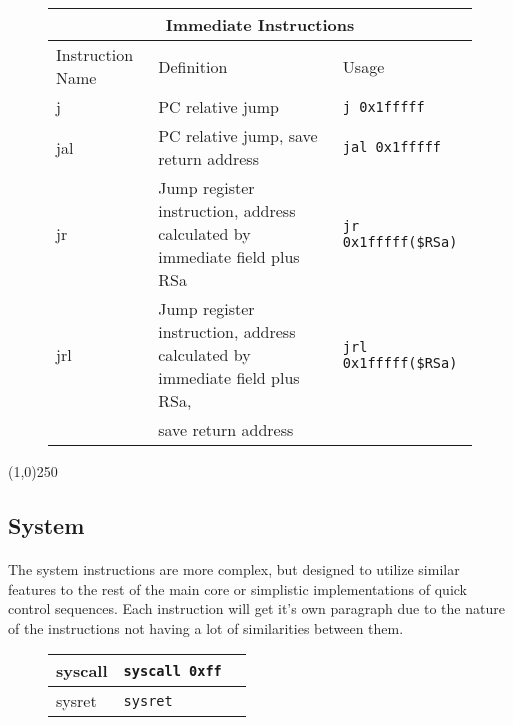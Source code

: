 \documentclass[letterpaper, 11pt]{article}
\begin{document}
\begin{figure}[!h]
	\begin{center}
		\begin{tabular}{|l|l|l|}
			\hline
			\multicolumn{3}{c}{Immediate Instructions} \\ \hline
			Instruction Name	& Definition																& Usage 							\\ \hline
			j					& PC relative jump															& \texttt{j 0x1fffff}	\\ \hline
			jal					& PC relative jump, save return address 									& \texttt{jal	0x1fffff}	\\ \hline
			jr					& Jump register instruction, address calculated by immediate field plus RSa	& \texttt{jr 0x1fffff(\$RSa)}	\\ \hline
			jrl					& Jump register instruction, address calculated by immediate field plus RSa,& \texttt{jrl 0x1fffff(\$RSa)}	\\ \hline
			\hfill				& save return address
		 		\end{tabular} 
	\end{center}
	
\end{figure}
\begin{center}
	\line(1,0){250}
\end{center}

\subsection{System}
\paragraph{} The system instructions are more complex, but designed to utilize similar features to the rest of the main core or simplistic
implementations of quick control sequences. Each instruction will get it's own paragraph due to the nature of the instructions
not having a lot of similarities between them.


\begin{figure}[!h]
	\begin{center}
		\begin{tabular}{|l|l|l|}
			\hline
			syscall		& \texttt{syscall 0xff}	\\ \hline
			sysret		& \texttt{sysret}	\\ \hline
		 		\end{tabular} 
	\end{center}
	
\end{figure}
\end{document}

